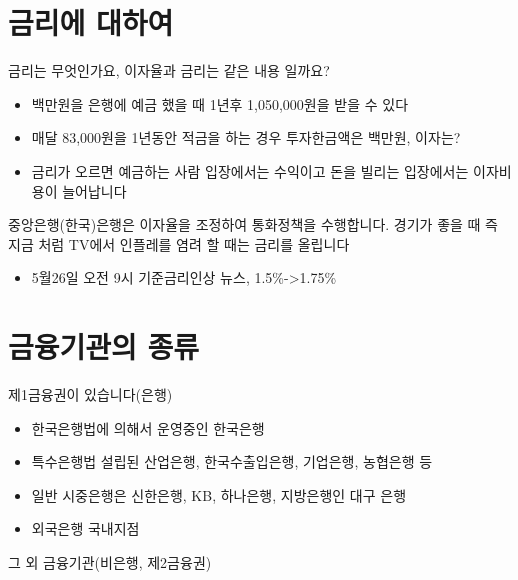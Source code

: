 \documentclass[
]{book}
\providecommand{\tightlist}{%
  \setlength{\itemsep}{0pt}\setlength{\parskip}{0pt}}
\begin{document}
\hypertarget{uxae08uxb9acuxc5d0-uxb300uxd558uxc5ec}{%
\section{금리에 대하여}\label{uxae08uxb9acuxc5d0-uxb300uxd558uxc5ec}}

금리는 무엇인가요, 이자율과 금리는 같은 내용 일까요?

\begin{itemize}
\tightlist
\item
  백만원을 은행에 예금 했을 때 1년후 1,050,000원을 받을 수 있다\\
\item
  매달 83,000원을 1년동안 적금을 하는 경우 투자한금액은 백만원, 이자는?\\
\item
  금리가 오르면 예금하는 사람 입장에서는 수익이고 돈을 빌리는 입장에서는 이자비용이 늘어납니다
\end{itemize}

중앙은행(한국)은행은 이자율을 조정하여 통화정책을 수행합니다. 경기가 좋을 때 즉 지금 처럼 TV에서 인플레를 염려 할 때는 금리를 올립니다

\begin{itemize}
\tightlist
\item
  5월26일 오전 9시 기준금리인상 뉴스, 1.5\%-\textgreater1.75\%
\end{itemize}

\hypertarget{uxae08uxc735uxae30uxad00uxc758-uxc885uxb958}{%
\section{금융기관의 종류}\label{uxae08uxc735uxae30uxad00uxc758-uxc885uxb958}}

제1금융권이 있습니다(은행)

\begin{itemize}
\tightlist
\item
  한국은행법에 의해서 운영중인 한국은행\\
\item
  특수은행법 설립된 산업은행, 한국수출입은행, 기업은행, 농협은행 등\\
\item
  일반 시중은행은 신한은행, KB, 하나은행, 지방은행인 대구 은행\\
\item
  외국은행 국내지점
\end{itemize}

그 외 금융기관(비은행, 제2금융권)
\end{document}

